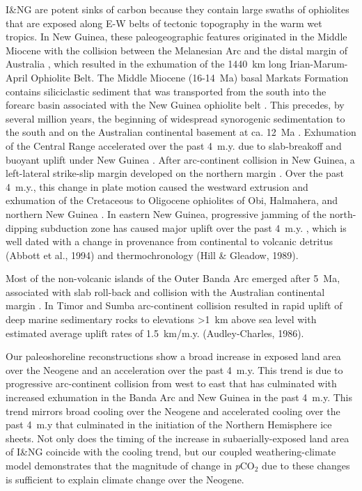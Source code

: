 \documentclass[11pt,letterpaper]{article}
\newcommand{\pCOtwo}{\textit{p}CO$_{2}$\xspace}
\begin{document}
I\&NG are potent sinks of carbon because they contain large swaths of ophiolites that are exposed along E-W belts of tectonic topography in the warm wet tropics. In New Guinea, these paleogeographic features originated in the Middle Miocene with the collision between the Melanesian Arc and the distal margin of Australia \citep{vanUfford2005a, Cloos2005a, Baldwin2012a}, which resulted in the exhumation of the 1440~km long Irian-Marum-April Ophiolite Belt. The Middle Miocene (16-14~Ma) basal Markats Formation contains siliciclastic sediment that was transported from the south into the forearc basin associated with the New Guinea ophiolite belt \citep{Cloos2005a}. This precedes, by several million years, the beginning of widespread synorogenic sedimentation to the south and on the Australian continental basement at ca. 12~Ma \citep{vanUfford2005a}. Exhumation of the Central Range accelerated over the past 4~m.y. due to slab-breakoff and buoyant uplift under New Guinea \citep{Cloos2005a}. After arc-continent collision in New Guinea, a left-lateral strike-slip margin developed on the northern margin \citep{Baldwin2012a}. Over the past 4~m.y., this change in plate motion caused the westward extrusion and exhumation of the Cretaceous to Oligocene ophiolites of Obi, Halmahera, and northern New Guinea \citep{Baldwin2012a}. In eastern New Guinea, progressive jamming of the north-dipping subduction zone has caused major uplift over the past 4~m.y. \citep{vanUfford2005a}, which is well dated with a change in provenance from continental to volcanic detritus (Abbott et al., 1994) and thermochronology (Hill \& Gleadow, 1989). 

Most of the non-volcanic islands of the Outer Banda Arc emerged after 5~Ma, associated with slab roll-back and collision with the Australian continental margin \citep{Harris2006a, Hall2013a}. In Timor and Sumba arc-continent collision resulted in rapid uplift of deep marine sedimentary rocks to elevations \textgreater1~km above sea level with estimated average uplift rates of 1.5~km/m.y. (Audley-Charles, 1986).

Our paleoshoreline reconstructions show a broad increase in exposed land area over the Neogene and an acceleration over the past 4~m.y. This trend is due to progressive arc-continent collision from west to east that has culminated with increased exhumation in the Banda Arc and New Guinea in the past 4~m.y. This trend mirrors broad cooling over the Neogene and accelerated cooling over the past 4~m.y that culminated in the initiation of the Northern Hemisphere ice sheets. Not only does the timing of the increase in subaerially-exposed land area of I\&NG coincide with the cooling trend, but our coupled weathering-climate model demonstrates that the magnitude of change in \pCOtwo due to these changes is sufficient to explain climate change over the Neogene.
\end{document}
